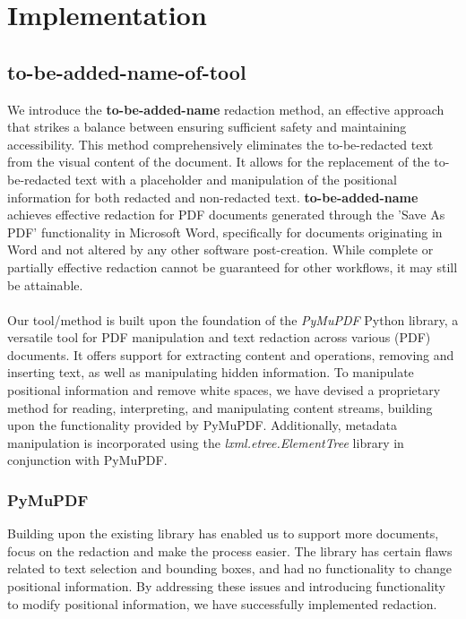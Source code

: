 \chapter{Implementation}

\section{to-be-added-name-of-tool}
We introduce the \textbf{to-be-added-name} redaction method, an effective approach that strikes a balance between ensuring sufficient safety and maintaining accessibility. This method comprehensively eliminates the to-be-redacted text from the visual content of the document. It allows for the replacement of the to-be-redacted text with a placeholder and manipulation of the positional information for both redacted and non-redacted text. \textbf{to-be-added-name} achieves effective redaction for PDF documents generated through the 'Save As PDF' functionality in Microsoft Word, specifically for documents originating in Word and not altered by any other software post-creation. While complete or partially effective redaction cannot be guaranteed for other workflows, it may still be attainable.
\\\\
Our tool/method is built upon the foundation of the \textit{PyMuPDF} \cite{PyMuPDF} Python library, a versatile tool for PDF manipulation and text redaction across various (PDF) documents. It offers support for extracting content and operations, removing and inserting text, as well as manipulating hidden information. To manipulate positional information and remove white spaces, we have devised a proprietary method for reading, interpreting, and manipulating content streams, building upon the functionality provided by PyMuPDF. Additionally, metadata manipulation is incorporated using the \textit{lxml.etree.ElementTree} library in conjunction with PyMuPDF.

\subsection{PyMuPDF}
Building upon the existing library has enabled us to support more documents, focus on the redaction and make the process easier. The library has certain flaws related to text selection and bounding boxes, and had no functionality to change positional information.  By addressing these issues and introducing functionality to modify positional information, we have successfully implemented redaction.


